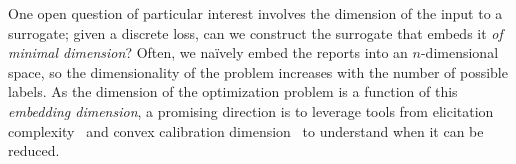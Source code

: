 \documentclass[12pt]{article}
\newcommand{\Comments}{1}
\newcommand{\mynote}[2]{\ifnum\Comments=1\textcolor{#1}{#2}\fi}
\newcommand{\jessie}[1]{\mynote{purple}{[JF: #1]}}
\newcommand{\reals}{\mathbb{R}}
\begin{document}
%
%


One open question of particular interest involves the dimension of the input to a surrogate; given a discrete loss, can we construct the surrogate that embeds it \emph{of minimal dimension}?
Often, we na\"ively embed the reports into an $n$-dimensional space, so the dimensionality of the problem increases with the number of possible labels.
As the dimension of the optimization problem is a function of this \emph{embedding dimension}, a promising direction is to leverage tools from elicitation complexity~\cite{lambert2008eliciting,frongillo2015elicitation} and convex calibration dimension~\cite{ramaswamy2016convex} to understand when it can be reduced.
\end{document}
